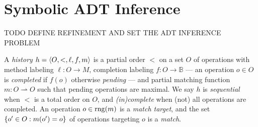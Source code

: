 \section{Symbolic ADT Inference}
\label{sec:inference}

TODO DEFINE REFINEMENT AND SET THE ADT INFERENCE PROBLEM

A \emph{history} $h = {\left\langle{O,<,\ell,f,m}\right\rangle}$ is a partial order $<$ on a set $O$
of operations with method labeling $\ell: O \to M$, completion labeling $f: O
\to \mathbb{B}$ — an operation $o \in O$ is \emph{completed} if $f(o)$
otherwise \emph{pending} — and partial matching function $m: O \rightharpoonup
O$ such that pending operations are maximal. We say $h$ is \emph{sequential}
when $<$ is a total order on $O$, and \emph{(in)complete} when (not) all
operations are completed. An operation $o \in \operatorname{rng}(m)$ is a \emph{match
target}, and the set ${\{{ o' \in O : m(o') = o}\}}$ of operations targeting $o$
is a \emph{match}.
